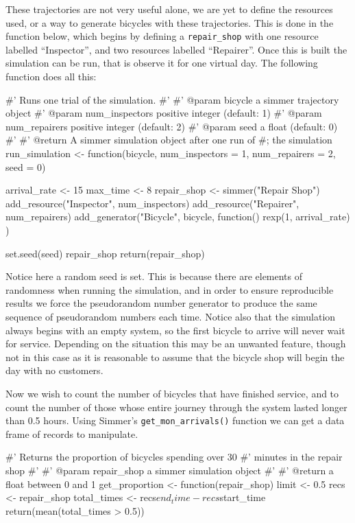 These trajectories are not very useful alone, we are yet to define the resources
used, or a way to generate bicycles with these trajectories. This is done in the
function below, which begins by defining a \texttt{repair_shop} with one
resource labelled ``Inspector'', and two resources labelled ``Repairer''.
Once this is built the simulation can be run, that is observe it for one
virtual day. The following function does all this:

\begin{Rin}
#' Runs one trial of the simulation.
#'
#' @param bicycle a simmer trajectory object
#' @param num_inspectors positive integer (default: 1)
#' @param num_repairers positive integer (default: 2)
#' @param seed a float (default: 0)
#'
#' @return A simmer simulation object after one run of
#;         the simulation
run_simulation <- function(bicycle,
                           num_inspectors = 1,
                           num_repairers = 2,
                           seed = 0) {
  arrival_rate <- 15
  max_time <- 8
  repair_shop <-
    simmer("Repair Shop") %
    add_resource("Inspector", num_inspectors) %
    add_resource("Repairer", num_repairers) %
    add_generator("Bicycle", bicycle, function() {
      rexp(1, arrival_rate)
    })

  set.seed(seed)
  repair_shop %
  return(repair_shop)
}
\end{Rin}

Notice here a random seed is set. This is because there are elements of
randomness when running the simulation, and in order to ensure reproducible
results we force the pseudorandom number generator to produce the same sequence
of pseudorandom numbers each time.
Notice also that the simulation always begins with an empty system, so the first
bicycle to arrive will never wait for service. Depending on the situation this
may be an unwanted feature, though not in this case as it is reasonable to
assume that the bicycle shop will begin the day with no customers.

Now we wish to count the number of bicycles that have finished service, and to
count the number of those whose entire journey through the system lasted longer
than 0.5 hours. Using Simmer's \texttt{get_mon_arrivals()} function we
can get a data frame of records to manipulate.

\begin{Rin}
#' Returns the proportion of bicycles spending over 30
#' minutes in the repair shop
#'
#' @param repair_shop a simmer simulation object
#'
#' @return a float between 0 and 1
get_proportion <- function(repair_shop) {
  limit <- 0.5
  recs <- repair_shop %
  total_times <- recs$end_time - recs$start_time
  return(mean(total_times > 0.5))
}
\end{Rin}

